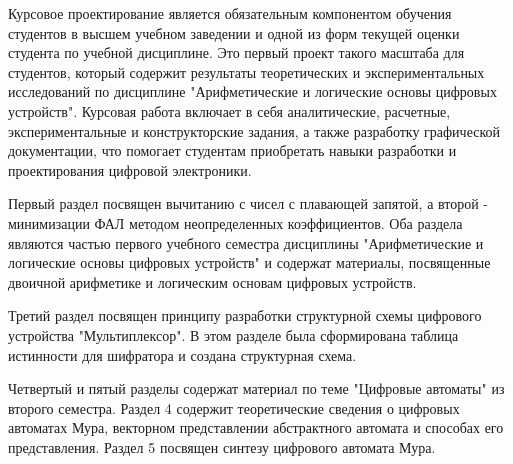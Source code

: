 Курсовое проектирование является обязательным компонентом обучения студентов в высшем учебном заведении и одной из форм текущей оценки студента по учебной дисциплине. Это первый проект такого масштаба для студентов, который содержит результаты теоретических и экспериментальных исследований по дисциплине "Арифметические и логические основы цифровых устройств". Курсовая работа включает в себя аналитические, расчетные, экспериментальные и конструкторские задания, а также разработку графической документации, что помогает студентам приобретать навыки разработки и проектирования цифровой электроники.

Первый раздел посвящен вычитанию с чисел с плавающей запятой, а второй - минимизации ФАЛ методом неопределенных коэффициентов. Оба раздела являются частью первого учебного семестра дисциплины "Арифметические и логические основы цифровых устройств" и содержат материалы, посвященные двоичной арифметике и логическим основам цифровых устройств.

Третий раздел посвящен принципу разработки структурной схемы цифрового устройства "Мультиплексор". В этом разделе была сформирована таблица истинности для шифратора и создана структурная схема.

Четвертый и пятый разделы содержат материал по теме "Цифровые автоматы" из второго семестра. Раздел 4 содержит теоретические сведения о цифровых автоматах Мура, векторном представлении абстрактного автомата и способах его представления. Раздел 5 посвящен синтезу цифрового автомата Мура.
